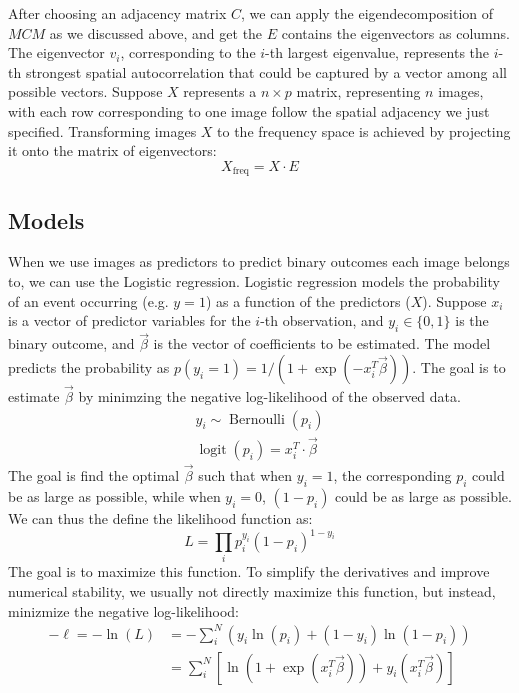 \documentclass[12pt]{article}
\begin{document}
After choosing an adjacency matrix \( C \), we can apply the eigendecomposition of \( M C M \) as we discussed above, and get the \( E \) contains the eigenvectors as columns. The eigenvector \( v_i \), corresponding to the \( i \)-th largest eigenvalue, represents the \( i \)-th strongest spatial autocorrelation that could be captured by a vector among all possible vectors. Suppose \( X \) represents a \( n \times p \) matrix, representing \( n \) images, with each row corresponding to one image follow the spatial adjacency we just specified. Transforming images \( X \) to the frequency space is achieved by projecting it onto the matrix of eigenvectors:
\[
  X_{\text{freq}} = X \cdot E
\]

\subsection{Models}

When we use images as predictors to predict binary outcomes each image belongs to, we can use the Logistic regression. Logistic regression models the probability of an event occurring (e.g. \( y = 1 \)) as a function of the predictors (\( X \)). Suppose \( x_i \) is a vector of predictor variables for the \( i \)-th observation, and \( y_i \in \{0, 1\} \) is the binary outcome, and \( \vec{\beta} \) is the vector of coefficients to be estimated. The model predicts the probability as \( p(y_i = 1) = 1 / (1 + \exp(-x_i^T \vec{\beta})) \). The goal is to estimate \( \vec{\beta} \) by minimzing the negative log-likelihood of the observed data.
\[
  \begin{gathered}
    y_i \sim \operatorname{Bernoulli} (p_i) \\
    \operatorname{logit} (p_i) = x_i^T \cdot \vec{\beta}
  \end{gathered}
\]
The goal is find the optimal \( \vec{\beta} \) such that when \( y_i = 1 \), the corresponding \( p_i \) could be as large as possible, while when \( y_i = 0 \), \( (1 - p_i) \) could be as large as possible. We can thus the define the likelihood function as:
\[
  L = \prod_i p_i^{y_i} (1 - p_i)^{1 - y_i}
\]
The goal is to maximize this function. To simplify the derivatives and improve numerical stability, we usually not directly maximize this function, but instead, minizmize the negative log-likelihood:
\[
  \begin{aligned}
    - \ell = - \ln(L) & =  - \sum_i^N (y_i \ln(p_i) + (1 - y_i) \ln(1 - p_i) ) \\
                      & = \sum_i^N \left[ \ln \left(1 + \exp(x_i^T \vec{\beta}) \right) + y_i (x_i^T \vec{\beta}) \right]
  \end{aligned}
\]
\end{document}
